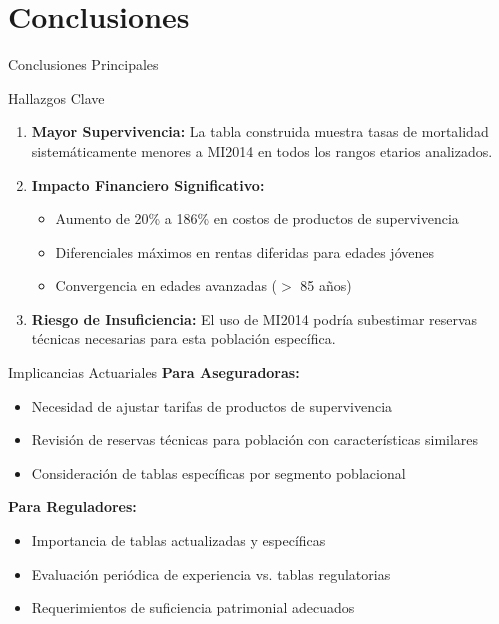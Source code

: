 \section{Conclusiones}

\begin{frame}{Conclusiones Principales}
  \begin{block}{Hallazgos Clave}
    \begin{enumerate}
      \item \textbf{Mayor Supervivencia:} La tabla construida muestra tasas de mortalidad sistemáticamente menores a MI2014 en todos los rangos etarios analizados.
      \item \textbf{Impacto Financiero Significativo:}
        \begin{itemize}
          \item Aumento de 20\% a 186\% en costos de productos de supervivencia
          \item Diferenciales máximos en rentas diferidas para edades jóvenes
          \item Convergencia en edades avanzadas ($>$ 85 años)
        \end{itemize}
      \item \textbf{Riesgo de Insuficiencia:} El uso de MI2014 podría subestimar reservas técnicas necesarias para esta población específica.
    \end{enumerate}
  \end{block}
\end{frame}

\begin{frame}{Implicancias Actuariales}
  \textbf{Para Aseguradoras:}
  \begin{itemize}
    \item Necesidad de ajustar tarifas de productos de supervivencia
    \item Revisión de reservas técnicas para población con características similares
    \item Consideración de tablas específicas por segmento poblacional
  \end{itemize}
  
  \vspace{0.5cm}
  
  \textbf{Para Reguladores:}
  \begin{itemize}
    \item Importancia de tablas actualizadas y específicas
    \item Evaluación periódica de experiencia vs. tablas regulatorias
    \item Requerimientos de suficiencia patrimonial adecuados
  \end{itemize}
\end{frame}

